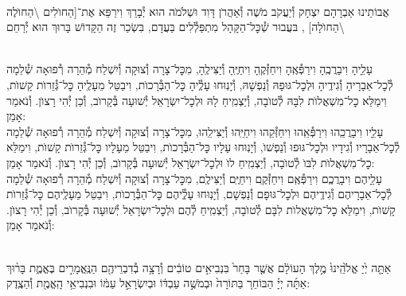 \documentclass[twoside, openany, parskip=half, 11pt]{book}
\begin{document}
\begin{sometimes}
\\
אֲבוֹתֵינוּ אַבְרָהָם יִצְחָק וְ֯יַעֲקֹב מֹשֶׁה וְ֯אַהֲרֹן דָּוִד וּשְׁלֹמֹה הוּא יְ֯בָרֵךְ וִירַפֵּא אֶת־[הַחוׂלִים \textbackslash הַחוׂלֶה \textbackslash הַחוׂלָה]
,
בּעֲבוּר שְׁ֯כׇּל־הַקָּהָל מִתְפַּלְ֯לִים בַּעֲדָם, בִּשְׂכַר זֶה
הַקָּדוֹשׁ בָּרוּךְ הוּא יְ֯רַחֵם
\setcolumnwidth{1.4in,1.4in,1.4in}
\begin{paracol}{3}
\\
עָלֵָיהָ וִיבָרֲכֶֽהָ וִירַפְּ֯אֶֽהָ וִיחַזְּ֯קֶֽהָ וִיחַיֶּֽהָ וְ֯יַצִּילֶֽהָ, מִכׇּל־צָרָה וְ֯צוּקָה וְ֯יִשְׁלַח מְ֯הֵרָה רְ֯פוּאָה שְׁ֯לֵמָה לְ֯כׇל־אֵבָרָיהָ וְ֯גִידֶֽיהָ וּלְכׇל־גּוּפָהּ וְ֯נַפְשָׁהּ, וְ֯יָנֽוּחוּ עָלְֶ֯יהָ כׇּל־הַבְּ֯רָכוׂת, וִיבַטֵּל מֵעָלֶֽיהָ כׇּל־גְּ֯זֵרוׂת קָשׁוׂת, וִימַלֵּא כׇל־מִשְׁאֲלוׂת לִבָּהּ לְ֯טוׂבָה, וְ֯יַצְמִֽיחַ לָהּ וּלְכׇל־יִשְׂרָאֵל יְ֯שׁוּעָה בְּ֯קָרוׂב, וְ֯כֵן יְ֯הִי רָצוׂן. וְ֯נֹאמַר אָמֵן:
\switchcolumn
{}\\
עָלֵָיו וִיבָרֲכֵֽהוּ וִירַפְּ֯אֵֽהוּ וִיחַזְּ֯קֵהוּ וִיחַיֵּֽהוּ וְ֯יַצִּילֵֽהוּ, מִכׇּל־צָרָה וְ֯צוּקָה וְ֯יִשְׁלַח מְ֯הֵרָה רְ֯פוּאָה שְׁ֯לֵמָה לְ֯כׇל־אֵבָרָיו וְ֯גִידָיו וּלְכׇל־גּוּפוּ וְ֯נַפְשׁוׂ, וְ֯יָנֽוּחוּ עָלָיו כׇּל־הַבְּ֯רָכוׂת, וִיבַטֵּל מֵעָלָיו כׇּל־גְּ֯זֵרוׂת קָשׁוׂת, וִימַלֵּא כׇל־מִשְׁאֲלוׂת לִבּוׂ לְ֯טוׂבָה, וְ֯יַצְמִֽיחַ לוׂ וּלְכׇל־יִשְׂרָאֵל יְ֯שׁוּעָה בְּ֯קָרוׂב, וְ֯כֵן יְ֯הִי רָצוׂן. וְ֯נֹאמַר אָמֵן:
\switchcolumn
{}\\
עָלֵָיהֶם וִיבָרֲכְֶם וִירַפְּ֯אֶֽם וִיחַזְּ֯קֶֽם וִיחַיֶּֽם וְ֯יַצִּילֶֽם, מִכׇּל־צָרָה וְ֯צוּקָה וְ֯יִשְׁלַח מְ֯הֵרָה רְ֯פוּאָה שְׁ֯לֵמָה לְ֯כׇל־אֵבָרָיהֶם וְ֯גִידֶֽיהֶם וּלְכׇל־גּוּפָם וְ֯נַפְשָׁם, וְ֯יָנֽוּחוּ עָלְֶ֯יהֶם כׇּל־הַבְּ֯רָכוׂת, וִיבַטֵּל מֵעָלֶֽיהֶם כׇּל־גְּ֯זֵרוׂת קָשׁוׂת, וִימַלֵּא כׇל־מִשְׁאֲלוׂת לִבָּם לְ֯טוׂבָה, וְ֯יַצְמִֽיחַ לְ֯הֶם וּלְכׇל־יִשְׂרָאֵל יְ֯שׁוּעָה בְּ֯קָרוׂב, וְ֯כֵן יְ֯הִי רָצוׂן. וְ֯נֹאמַר אָמֵן:
\end{paracol}

\end{sometimes}

\halfkaddish

\hagbaha

\galila


\\
אַתָּ֤ה יְ֙יָ אֱלֹ֙הֵֽינוּ֙ מֶ֣לֶךְ הָעוֹלָ֔ם אֲשֶׁ֤ר בָּחַר֙ בִּנְבִיאִ֣ים טוֹבִ֔ים וְ֯רָצָ֥ה בְ֯דִבְרֵיהֶ֖ם הַנֶּֽאֱמָרִ֣ים בֶּאֱמֶ֑ת בָּר֨וּךְ אַתָּ֜ה יְיָ֗ הַבּוֹחֵר֚ בַּתּוֹרָה֙ וּבְמֹשֶׁ֣ה עַבְדּ֔וֹ וּבְיִשְׂרָאֵ֣ל עַמּ֔וֹ וּבִנְבִיאֵ֥י הָֽאֱמֶ֖ת וְ֯הַצֶֽדֶק:
\end{document}
